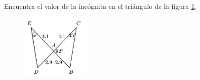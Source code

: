 \question[10]  Encuentra el valor de la incógnita en el triángulo de la figura \ref{fig:angle_triangle_14}.
\begin{figure}[H]
    \begin{center}
        \includegraphics[width=0.3\textwidth]{../images/angle_triangle_14.png}
    \end{center}
    \caption{}
    \label{fig:angle_triangle_14}
\end{figure}